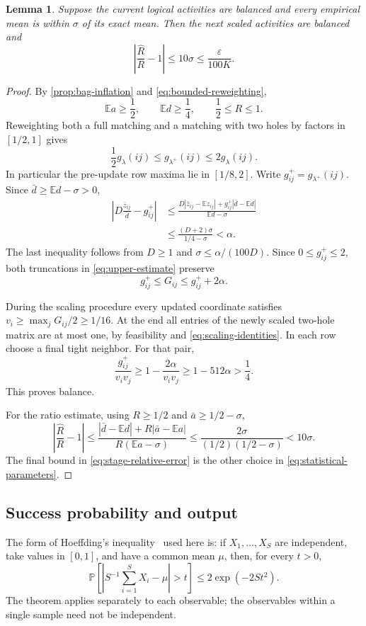 \documentclass[11pt]{article}
\newtheorem{lemma}[theorem]{Lemma}
\theoremstyle{definition}
\theoremstyle{remark}
\newcommand{\E}{\mathbb E}
\newcommand{\Prb}{\mathbb P}
\newcommand{\eps}{\varepsilon}
\numberwithin{equation}{section}
\begin{document}
\begin{lemma}\label{lem:successful-stage}
Suppose the current logical activities are balanced and every empirical
mean is within $\sigma$ of its exact mean. Then the next scaled
activities are balanced and
\begin{equation}\label{eq:stage-relative-error}
 \left|\frac{\widehat R}{R}-1\right|
 \le10\sigma\le\frac\eps{100K}.
\end{equation}
\end{lemma}
\begin{proof}
By \cref{prop:bag-inflation} and \eqref{eq:bounded-reweighting},
\[
 \E a\ge\frac12,\qquad \E d\ge\frac14,
 \qquad\frac12\le R\le1.
\]
Reweighting both a full matching and a matching with two holes by
factors in $[1/2,1]$ gives
\[
 \frac12 g_\lambda(ij)\le g_{\lambda^+}(ij)
                         \le2g_\lambda(ij).
\]
In particular the pre-update row maxima lie in $[1/8,2]$.
Write $g^+_{ij}=g_{\lambda^+}(ij)$. Since $\bar d\ge\E d-\sigma>0$,
\begin{align*}
 \left|D\frac{\bar z_{ij}}{\bar d}-g^+_{ij}\right|
 &\le\frac{D|\bar z_{ij}-\E z_{ij}|
              +g^+_{ij}|\bar d-\E d|}{\E d-\sigma}\\
 &\le\frac{(D+2)\sigma}{1/4-\sigma}<\alpha.
\end{align*}
The last inequality follows from $D\ge1$ and
$\sigma\le\alpha/(100D)$. Since $0\le g^+_{ij}\le2$, both truncations
in \eqref{eq:upper-estimate} preserve
\begin{equation}\label{eq:upper-estimate-accuracy}
 g^+_{ij}\le G_{ij}\le g^+_{ij}+2\alpha.
\end{equation}

During the scaling procedure every updated coordinate satisfies
$v_i\ge\max_jG_{ij}/2\ge1/16$. At the end all entries of the newly
scaled two-hole matrix are at most one, by feasibility and
\eqref{eq:scaling-identities}. In each row choose a final tight neighbor.
For that pair,
\[
 \frac{g^+_{ij}}{v_i v_j}
 \ge1-\frac{2\alpha}{v_i v_j}
 \ge1-512\alpha>\frac14.
\]
This proves balance.

For the ratio estimate, using $R\ge1/2$ and $\bar a\ge1/2-\sigma$,
\[
 \left|\frac{\widehat R}{R}-1\right|
 \le\frac{|\bar d-\E d|+R|\bar a-\E a|}
            {R(\E a-\sigma)}
 \le\frac{2\sigma}{(1/2)(1/2-\sigma)}
 <10\sigma.
\]
The final bound in \eqref{eq:stage-relative-error} is the other choice
in \eqref{eq:statistical-parameters}.
\end{proof}

\subsection{Success probability and output}
The form of Hoeffding's inequality~\cite[Theorem~2]{Hoeffding1963}
used here is:
if $X_1,\ldots,X_S$ are independent, take values in $[0,1]$, and have
a common mean $\mu$, then, for every $t>0$,
\begin{equation}\label{eq:hoeffding}
 \Prb\left[\left|S^{-1}\sum_{i=1}^S X_i-\mu\right|>t\right]
 \le2\exp(-2St^2).
\end{equation}
The theorem applies separately to each observable; the observables
within a single sample need not be independent.
\end{document}
